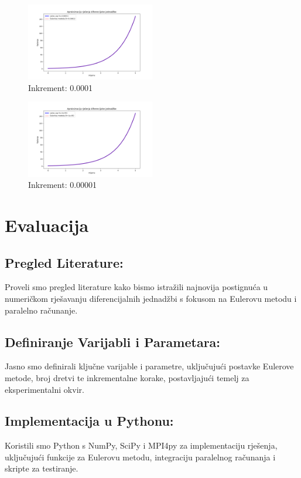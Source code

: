 \documentclass[conference]{IEEEtran}
\begin{document}
     \begin{figure}[htbp]
        \includegraphics[width=0.5\textwidth]{slike/Figure_5.png}
        \caption{Inkrement: 0.0001}
        \label{fig:Figure_5}
    \end{figure}
     \begin{figure}[htbp]
        \includegraphics[width=0.5\textwidth]{slike/Figure_6.png}
        \caption{Inkrement: 0.00001}
        \label{fig:Figure_6}
    \end{figure}

\newpage
\section{Evaluacija}
\subsection{Pregled Literature:}
Proveli smo pregled literature kako bismo istražili najnovija postignuća u numeričkom rješavanju diferencijalnih jednadžbi s fokusom na Eulerovu metodu i paralelno računanje.
\subsection{Definiranje Varijabli i Parametara:}
Jasno smo definirali ključne varijable i parametre, uključujući postavke Eulerove metode, broj dretvi te inkrementalne korake, postavljajući temelj za eksperimentalni okvir.
\subsection{Implementacija u Pythonu:}
Koristili smo Python s NumPy, SciPy i MPI4py za implementaciju rješenja, uključujući funkcije za Eulerovu metodu, integraciju paralelnog računanja i skripte za testiranje.
\end{document}
